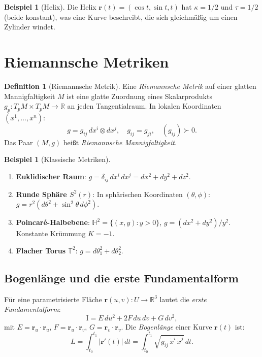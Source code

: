 \documentclass[12pt,a4paper]{amsart}
\theoremstyle{definition}
\newtheorem{definition}[theorem]{Definition}
\newtheorem{beispiel}[theorem]{Beispiel}
\begin{document}
\begin{beispiel}[Helix]
Die Helix $\mathbf{r}(t) = (\cos t, \sin t, t)$ hat
$\kappa = 1/2$ und $\tau = 1/2$ (beide konstant), was eine Kurve beschreibt,
die sich gleichmäßig um einen Zylinder windet.
\end{beispiel}

\section{Riemannsche Metriken}
\label{sec:metriken}

\begin{definition}[Riemannsche Metrik]
Eine \emph{Riemannsche Metrik} auf einer glatten Mannigfaltigkeit $M$ ist eine
glatte Zuordnung eines Skalarprodukts $g_p: T_pM \times T_pM \to \mathbb{R}$
an jeden Tangentialraum. In lokalen Koordinaten $(x^1, \ldots, x^n)$:
\[
  g = g_{ij}\,dx^i \otimes dx^j, \quad g_{ij} = g_{ji}, \quad (g_{ij}) \succ 0.
\]
Das Paar $(M, g)$ heißt \emph{Riemannsche Mannigfaltigkeit}.
\end{definition}

\begin{beispiel}[Klassische Metriken]
\begin{enumerate}[label=(\alph*)]
  \item \textbf{Euklidischer Raum}: $g = \delta_{ij}\,dx^i\,dx^j = dx^2 + dy^2 + dz^2$.
  \item \textbf{Runde Sphäre $S^2(r)$}: In sphärischen Koordinaten
        $(\theta, \phi)$: $g = r^2(d\theta^2 + \sin^2\!\theta\,d\phi^2)$.
  \item \textbf{Poincaré-Halbebene}: $\mathbb{H}^2 = \{(x,y): y>0\}$,
        $g = (dx^2 + dy^2)/y^2$. Konstante Krümmung $K = -1$.
  \item \textbf{Flacher Torus $\mathbb{T}^2$}: $g = d\theta_1^2 + d\theta_2^2$.
\end{enumerate}
\end{beispiel}

\subsection{Bogenlänge und die erste Fundamentalform}

Für eine parametrisierte Fläche $\mathbf{r}(u,v): U \to \mathbb{R}^3$ lautet
die \emph{erste Fundamentalform}:
\[
  \mathrm{I} = E\,du^2 + 2F\,du\,dv + G\,dv^2,
\]
mit $E = \mathbf{r}_u \cdot \mathbf{r}_u$, $F = \mathbf{r}_u \cdot \mathbf{r}_v$,
$G = \mathbf{r}_v \cdot \mathbf{r}_v$. Die \emph{Bogenlänge} einer Kurve
$\mathbf{r}(t)$ ist:
\[
  L = \int_{t_0}^{t_1} |\mathbf{r}'(t)|\,dt
    = \int_{t_0}^{t_1} \sqrt{g_{ij}\,\dot{x}^i\,\dot{x}^j}\,dt.
\]
\end{document}

